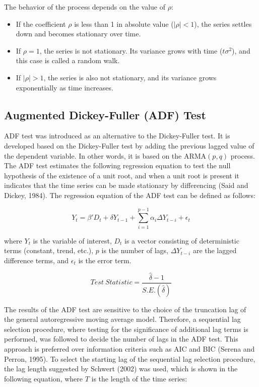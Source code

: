 \documentclass[12pt]{article}
\begin{document}
	\vspace{0.75cm}
	
	The behavior of the process depends on the value of \(\rho\):
	
	\begin{itemize}
		\item If the coefficient \(\rho\) is less than 1 in absolute value (\(|\rho| < 1\)), the series settles down and becomes stationary over time.
		
		\item If \(\rho = 1\), the series is not stationary. Its variance grows with time (\(t\sigma^2\)), and this case is called a random walk.
		
		\item If \(|\rho| > 1\), the series is also not stationary, and its variance grows exponentially as time increases.
	\end{itemize}
	
	
	\subsection{Augmented Dickey-Fuller (ADF) Test}
	
	ADF test was introduced as an alternative to the Dickey-Fuller test. It is developed based on the Dickey-Fuller test by adding the previous lagged value of the dependent variable. In other words, it is based on the ARMA$(p,q)$ process. The ADF test estimates the following regression equation to test the null hypothesis of the existence of a unit root, and when a unit root is present it indicates that the time series can be made stationary by differencing (Said and Dickey, 1984). The regression equation of the ADF test can be defined as follows:
	
	\[
		Y_t = \beta' D_t + \delta Y_{t-1} + \sum_{i=1}^{p-1} \alpha_i \Delta Y_{t-i} + \epsilon_t
	\]
	
	\noindent where \(Y_t\) is the variable of interest, \(D_t\) is a vector consisting of deterministic terms (constant, trend, etc.), \(p\) is the number of lags, \(\Delta Y_{t-i}\) are the lagged difference terms, and \(\epsilon_t\) is the error term.
	
	\[
		Test\ Statistic =
		\frac{\hat{\delta}-1}
		{S.E.(\hat{\delta})}
	\]
	
	The results of the ADF test are sensitive to the choice of the truncation lag of the general autoregressive moving average model. Therefore, a sequential lag selection procedure, where testing for the significance of additional lag terms is performed, was followed to decide the number of lags in the ADF test. This approach is preferred over information criteria such as AIC and BIC (Serena and Perron, 1995). To select the starting lag of the sequential lag selection procedure, the lag length suggested by Schwert (2002) was used, which is shown in the following equation, where \(T\) is the length of the time series:
	
\end{document}
